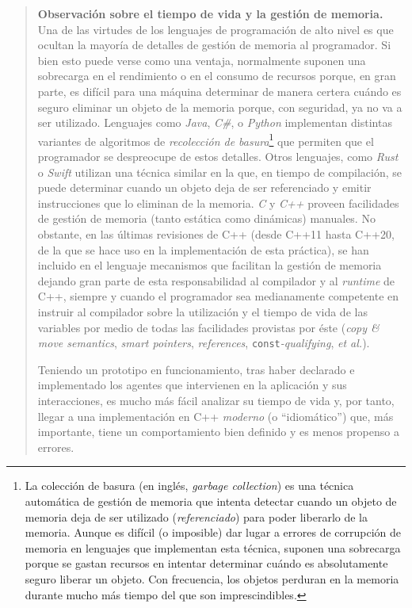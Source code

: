 \documentclass[a4paper]{article}
\begin{document}
	\begin{quote}
		\textbf{Observación sobre el tiempo de vida y la gestión de memoria.} Una de las virtudes de los lenguajes de programación de alto nivel es que ocultan la mayoría de detalles de gestión de memoria al programador. Si bien esto puede verse como una ventaja, normalmente suponen una sobrecarga en el rendimiento o en el consumo de recursos porque, en gran parte, es difícil para una máquina determinar de manera certera cuándo es seguro eliminar un objeto de la memoria porque, con seguridad, ya no va a ser utilizado. Lenguajes como \textit{Java}, \textit{C\#}, o \textit{Python} implementan distintas variantes de algoritmos de \textit{recolección de basura}\footnote{La colección de basura (en inglés, \textit{garbage collection}) es una técnica automática de gestión de memoria que intenta detectar cuando un objeto de memoria deja de ser utilizado (\textit{referenciado}) para poder liberarlo de la memoria. Aunque es difícil (o imposible) dar lugar a errores de corrupción de memoria en lenguajes que implementan esta técnica, suponen una sobrecarga porque se gastan recursos en intentar determinar cuándo es absolutamente seguro liberar un objeto. Con frecuencia, los objetos perduran en la memoria durante mucho más tiempo del que son imprescindibles.} que permiten que el programador se despreocupe de estos detalles. Otros lenguajes, como \textit{Rust} o \textit{Swift} utilizan una técnica similar \cite{arc} en la que, en tiempo de compilación, se puede determinar cuando un objeto deja de ser referenciado y emitir instrucciones que lo eliminan de la memoria. \textit{C} y \textit{C++} proveen facilidades de gestión de memoria (tanto estática como dinámicas) manuales. No obstante, en las últimas revisiones de C++ (desde C++11 hasta C++20, de la que se hace uso en la implementación de esta práctica), se han incluido en el lenguaje mecanismos que facilitan la gestión de memoria dejando gran parte de esta responsabilidad al compilador y al \textit{runtime} de C++, siempre y cuando el programador sea medianamente competente en instruir al compilador sobre la utilización y el tiempo de vida de las variables por medio de todas las facilidades provistas por éste (\textit{copy \& move semantics}, \textit{smart pointers}, \textit{references}, \texttt{const}\textit{-qualifying}, \textit{et al.}).
		
		Teniendo un prototipo en funcionamiento, tras haber declarado e implementado los agentes que intervienen en la aplicación y sus interacciones, es mucho más fácil analizar su tiempo de vida y, por tanto, llegar a una implementación en C++ \textit{moderno} (o ``idiomático'') que, más importante, tiene un comportamiento bien definido y es menos propenso a errores\cite{cppcon}.
	\end{quote}
	
\end{document}
